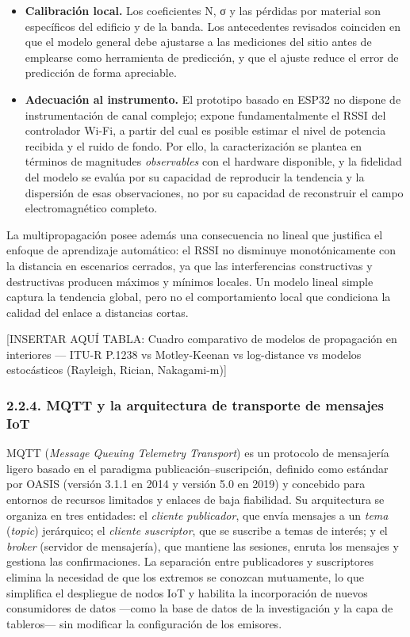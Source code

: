 \documentclass[
  12pt,
]{article}
\providecommand{\tightlist}{%
  \setlength{\itemsep}{0pt}\setlength{\parskip}{0pt}}
\begin{document}
\begin{itemize}
\tightlist
\item
  \textbf{Calibración local.} Los coeficientes N, σ y las pérdidas por
  material son específicos del edificio y de la banda. Los antecedentes
  revisados coinciden en que el modelo general debe ajustarse a las
  mediciones del sitio antes de emplearse como herramienta de
  predicción, y que el ajuste reduce el error de predicción de forma
  apreciable.
\item
  \textbf{Adecuación al instrumento.} El prototipo basado en ESP32 no
  dispone de instrumentación de canal complejo; expone fundamentalmente
  el RSSI del controlador Wi-Fi, a partir del cual es posible estimar el
  nivel de potencia recibida y el ruido de fondo. Por ello, la
  caracterización se plantea en términos de magnitudes
  \emph{observables} con el hardware disponible, y la fidelidad del
  modelo se evalúa por su capacidad de reproducir la tendencia y la
  dispersión de esas observaciones, no por su capacidad de reconstruir
  el campo electromagnético completo.
\end{itemize}

La multipropagación posee además una consecuencia no lineal que
justifica el enfoque de aprendizaje automático: el RSSI no disminuye
monotónicamente con la distancia en escenarios cerrados, ya que las
interferencias constructivas y destructivas producen máximos y mínimos
locales. Un modelo lineal simple captura la tendencia global, pero no el
comportamiento local que condiciona la calidad del enlace a distancias
cortas.

{[}INSERTAR AQUÍ TABLA: Cuadro comparativo de modelos de propagación en
interiores — ITU-R P.1238 vs Motley-Keenan vs log-distance vs modelos
estocásticos (Rayleigh, Rician, Nakagami-m){]}

\subsubsection{2.2.4. MQTT y la arquitectura de transporte de mensajes
IoT}\label{mqtt-y-la-arquitectura-de-transporte-de-mensajes-iot}

MQTT (\emph{Message Queuing Telemetry Transport}) es un protocolo de
mensajería ligero basado en el paradigma publicación–suscripción,
definido como estándar por OASIS (versión 3.1.1 en 2014 y versión 5.0 en
2019) y concebido para entornos de recursos limitados y enlaces de baja
fiabilidad. Su arquitectura se organiza en tres entidades: el
\emph{cliente publicador}, que envía mensajes a un \emph{tema}
(\emph{topic}) jerárquico; el \emph{cliente suscriptor}, que se suscribe
a temas de interés; y el \emph{broker} (servidor de mensajería), que
mantiene las sesiones, enruta los mensajes y gestiona las
confirmaciones. La separación entre publicadores y suscriptores elimina
la necesidad de que los extremos se conozcan mutuamente, lo que
simplifica el despliegue de nodos IoT y habilita la incorporación de
nuevos consumidores de datos —como la base de datos de la investigación
y la capa de tableros— sin modificar la configuración de los emisores.
\end{document}
